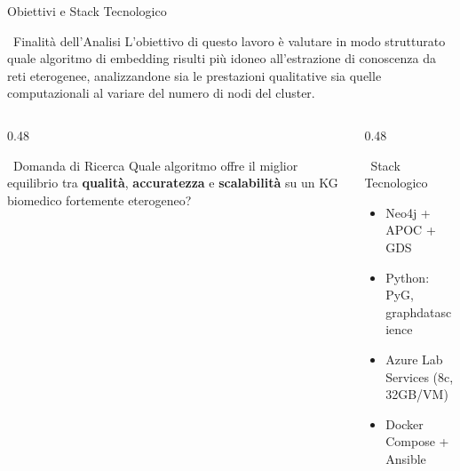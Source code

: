\documentclass[aspectratio=169]{beamer}
\newcommand{\icoWarn}{\faExclamationTriangle}
\newcommand{\icoIdea}{\faLightbulb}
\newcommand{\icoCogs}{\faCogs}
\newcommand{\icoDB}{\faDatabase}
\newcommand{\icoPy}{\faPython}
\newcommand{\icoDocker}{\faDocker}
\newcommand{\icoCloud}{\faCloud}
\newcommand{\icoWarn}{\textbf{!}}
\newcommand{\icoIdea}{\textbf{$\bigstar$}}
\newcommand{\icoCogs}{\ding{102}}
\newcommand{\icoDB}{\ding{110}}
\newcommand{\icoPy}{\ding{228}}
\newcommand{\icoDocker}{\ding{117}}
\newcommand{\icoCloud}{\ding{117}}
\begin{document}
\begin{frame}{Obiettivi e Stack Tecnologico}
  \begin{block}{\icoIdea\ Finalit\`a dell'Analisi}
    \small
    L'obiettivo di questo lavoro è valutare in modo strutturato quale algoritmo di embedding risulti più idoneo all'estrazione di conoscenza da reti eterogenee, analizzandone sia le prestazioni qualitative sia quelle computazionali al variare del numero di nodi del cluster.
  \end{block}
  \vspace{0.4cm}
  \begin{columns}[T]
    \begin{column}{0.48\textwidth}
      \begin{alertblock}{\icoWarn\ Domanda di Ricerca}
        \small
        Quale algoritmo offre il miglior equilibrio tra
        \textbf{qualit\`a}, \textbf{accuratezza} e
        \textbf{scalabilit\`a} su un KG biomedico fortemente eterogeneo?
      \end{alertblock}
    \end{column}
    \begin{column}{0.48\textwidth}
      \begin{block}{\icoCogs\ Stack Tecnologico}
        \small
        \begin{itemize}
          \item[\icoDB] Neo4j + APOC + GDS
          \item[\icoPy] Python: PyG, graphdatascience
          \item[\icoCloud] Azure Lab Services (8c, 32GB/VM)
          \item[\icoDocker] Docker Compose + Ansible
        \end{itemize}
      \end{block}
    \end{column}
  \end{columns}
\end{frame}
\end{document}
